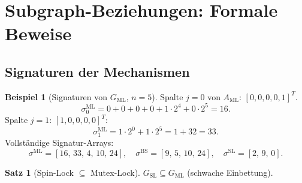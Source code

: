 ﻿\documentclass[a4paper,12pt]{article}
\theoremstyle{definition}
\newtheorem{beispiel}{Beispiel}
\newtheorem{satz}{Satz}
\begin{document}
\section{Subgraph-Beziehungen: Formale Beweise}
\label{sec:beweise}

\subsection{Signaturen der Mechanismen}

\begin{beispiel}[Signaturen von $G_{\mathrm{ML}}$, $n=5$]
Spalte $j=0$ von $A_{\mathrm{ML}}$: $[0,0,0,0,1]^T$.
\[
  \sigma_0^{\mathrm{ML}} = 0{+}0{+}0{+}0{+}1\cdot2^4 + 0\cdot2^5
  = 16.
\]
Spalte $j=1$: $[1,0,0,0,0]^T$:
\[
  \sigma_1^{\mathrm{ML}} = 1\cdot2^0 + 1\cdot2^5 = 1 + 32 = 33.
\]
Vollständige Signatur-Arrays:
\[
  \sigma^{\mathrm{ML}} = [16,\,33,\,4,\,10,\,24],\quad
  \sigma^{\mathrm{BS}} = [9,\,5,\,10,\,24],\quad
  \sigma^{\mathrm{SL}} = [2,\,9,\,0].
\]
\end{beispiel}

\begin{satz}[Spin-Lock $\subseteq$ Mutex-Lock]
\label{satz:sl_ml}
$G_{\mathrm{SL}} \subseteq G_{\mathrm{ML}}$ (schwache Einbettung).
\end{satz}
\end{document}
